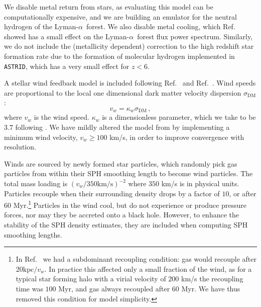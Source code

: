 \documentclass[a4paper,11pt]{article}
\newcommand{\Lya}{Lyman-$\alpha$}
\newcommand{\astrid}{\texttt{ASTRID}}
\begin{document}
We disable metal return from stars, as evaluating this model can be computationally expensive, and we are building an emulator for the neutral hydrogen of the \Lya~forest. We also disable metal cooling, which Ref.~\cite{Viel:2013} showed has a small effect on the \Lya~forest flux power spectrum. Similarly, we do not include the (metallicity dependent) correction to the high redshift star formation rate due to the formation of molecular hydrogen implemented in \astrid, which has a very small effect for $z < 6$.

A stellar wind feedback model is included following Ref.~\citep{Okamoto:2010} and Ref.~\cite{Bird:2022}. Wind speeds are proportional to the local one dimensional dark matter velocity dispersion $\sigma_\mathrm{DM}$:
\begin{equation}
v_w = \kappa_w \sigma_\mathrm{DM} \,,
\end{equation}
where $v_w$ is the wind speed. $\kappa_w$ is a dimensionless parameter, which we take to be $3.7$ following \cite{Vogelsberger:2013}. We have mildly altered the model from \cite{Bird:2022} by implementing a minimum wind velocity, $v_w \geq 100$ km/s, in order to improve convergence with resolution.

Winds are sourced by newly formed star particles, which randomly pick gas particles from within their SPH smoothing length to become wind particles. The total mass loading is $(v_w/ 350 \mathrm{km/s})^{-2}$ where $350$ km/s is in physical units. Particles recouple when their surrounding density drops by a factor of $10$, or after $60$ Myr.\footnote{In Ref.~\cite{Bird:2022} we had a subdominant recoupling condition: gas would recouple after $20 \mathrm{kpc} / v_w$. In practice this affected only a small fraction of the wind, as for a typical star forming halo with a virial velocity of $200$ km/s the recoupling time was $100$ Myr, and gas always recoupled after $60$ Myr. We have thus removed this condition for model simplicity.} Particles in the wind cool, but do not experience or produce pressure forces, nor may they be accreted onto a black hole. However, to enhance the stability of the SPH density estimates, they are included when computing SPH smoothing lengths.
\end{document}
